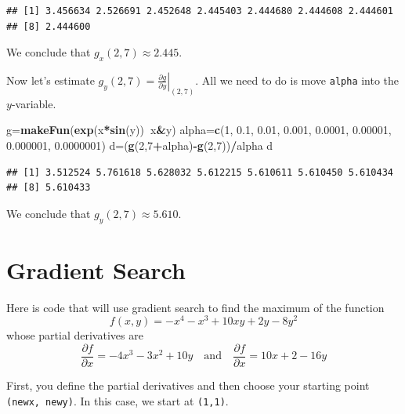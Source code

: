 \documentclass[
]{book}
\newenvironment{Shaded}{\begin{snugshade}}{\end{snugshade}}
\newcommand{\DecValTok}[1]{\textcolor[rgb]{0.00,0.00,0.81}{#1}}
\newcommand{\FloatTok}[1]{\textcolor[rgb]{0.00,0.00,0.81}{#1}}
\newcommand{\KeywordTok}[1]{\textcolor[rgb]{0.13,0.29,0.53}{\textbf{#1}}}
\newcommand{\NormalTok}[1]{#1}
\newcommand{\OperatorTok}[1]{\textcolor[rgb]{0.81,0.36,0.00}{\textbf{#1}}}
\begin{document}
\begin{verbatim}
## [1] 3.456634 2.526691 2.452648 2.445403 2.444680 2.444608 2.444601
## [8] 2.444600
\end{verbatim}

We conclude that \(g_x(2,7) \approx 2.445.\)

Now let's estimate \(g_y(2,7) = \left. \frac{\partial g}{\partial y} \right|_{(2,7)}\). All we need to do is move \texttt{alpha} into the \(y\)-variable.

\begin{Shaded}
\begin{Highlighting}[]
\NormalTok{g=}\KeywordTok{makeFun}\NormalTok{(}\KeywordTok{exp}\NormalTok{(x}\OperatorTok{*}\KeywordTok{sin}\NormalTok{(y))}\OperatorTok{~}\NormalTok{x}\OperatorTok{&}\NormalTok{y)}
\NormalTok{alpha=}\KeywordTok{c}\NormalTok{(}\DecValTok{1}\NormalTok{, }\FloatTok{0.1}\NormalTok{, }\FloatTok{0.01}\NormalTok{, }\FloatTok{0.001}\NormalTok{, }\FloatTok{0.0001}\NormalTok{, }\FloatTok{0.00001}\NormalTok{, }\FloatTok{0.000001}\NormalTok{, }\FloatTok{0.0000001}\NormalTok{)}
\NormalTok{d=(}\KeywordTok{g}\NormalTok{(}\DecValTok{2}\NormalTok{,}\DecValTok{7}\OperatorTok{+}\NormalTok{alpha)}\OperatorTok{-}\KeywordTok{g}\NormalTok{(}\DecValTok{2}\NormalTok{,}\DecValTok{7}\NormalTok{))}\OperatorTok{/}\NormalTok{alpha}
\NormalTok{d}
\end{Highlighting}
\end{Shaded}

\begin{verbatim}
## [1] 3.512524 5.761618 5.628032 5.612215 5.610611 5.610450 5.610434
## [8] 5.610433
\end{verbatim}

We conclude that \(g_y(2,7) \approx 5.610.\)

\hypertarget{gradient-search}{%
\section{Gradient Search}\label{gradient-search}}

Here is code that will use gradient search to find the maximum of the function
\[
f(x,y) = - x^4 -  x^3 + 10 x y + 2y - 8 y^2 
\]
whose partial derivatives are
\[
\frac{\partial f}{\partial x} = -4 x^3 -3 x^2  + 10 y
\quad \mbox{and} \quad
\frac{\partial f}{\partial x} = 10 x + 2 - 16 y
\]

First, you define the partial derivatives and then choose your starting point \texttt{(newx,\ newy)}. In this case, we start at \texttt{(1,1)}.
\end{document}
